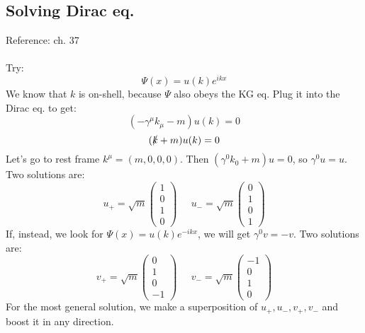 \documentclass[12 pt]{article}
\begin{document}
\subsection*{Solving Dirac eq.}
Reference: ch. 37
\\
\\
Try:
\[     \Psi (x) = u(k) e^{ikx}      \]
We know that $k$ is on-shell, because $\Psi$ also obeys the KG eq. Plug it into the Dirac eq. to get:
\[      ( - \gamma^{\mu} k_{\mu} - m) u(k) = 0     \]
\[      (\slashed k + m) u(k) = 0    \]
Let's go to rest frame $k^{\mu} = (m,0,0,0) $. Then $(\gamma^0 k_0 + m ) u = 0$, so $\gamma^0 u = u$. Two solutions are:
\[      u_+ = \sqrt{m} \left( \begin{array} {c} 1 \\ 0 \\ 1 \\ 0 \end{array} \right)  \;\;\;\;\;     u_- = \sqrt{m} \left( \begin{array} {c} 0 \\ 1 \\ 0 \\ 1 \end{array} \right)     \]
If, instead, we look for $  \Psi (x) = u(k) e^{-ikx}  $, we will get $\gamma^0 v = -v$. Two solutions are:
\[      v_+ = \sqrt{m} \left( \begin{array} {c} 0 \\ 1 \\ 0 \\ -1 \end{array} \right)  \;\;\;\;\;     v_- = \sqrt{m} \left( \begin{array} {c} -1 \\ 0 \\ 1 \\ 0 \end{array} \right)     \]
For the most general solution, we make a superposition of $u_+, u_-, v_+, v_-$ and boost it in any direction.
\end{document}
